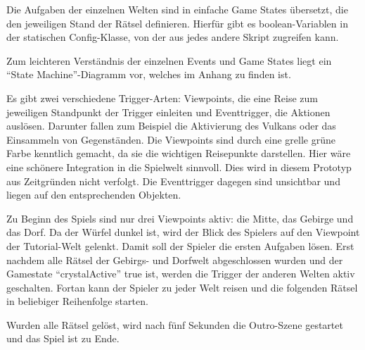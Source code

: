 
Die Aufgaben der einzelnen Welten sind in einfache Game States übersetzt, die den jeweiligen Stand der Rätsel definieren. Hierfür gibt es boolean-Variablen in der statischen Config-Klasse, von der aus jedes andere Skript zugreifen kann.

Zum leichteren Verständnis der einzelnen Events und Game States liegt ein \enquote{State Machine}-Diagramm vor, welches im Anhang zu finden ist.

Es gibt zwei verschiedene Trigger-Arten: Viewpoints, die eine Reise zum jeweiligen Standpunkt der Trigger einleiten und Eventtrigger, die Aktionen auslösen. Darunter fallen zum Beispiel die Aktivierung des Vulkans oder das Einsammeln von Gegenständen.
Die Viewpoints sind durch eine grelle grüne Farbe kenntlich gemacht, da sie die wichtigen Reisepunkte darstellen. Hier wäre eine schönere Integration in die Spielwelt sinnvoll. Dies wird in diesem Prototyp aus Zeitgründen nicht verfolgt. Die Eventtrigger dagegen sind unsichtbar und liegen auf den entsprechenden Objekten.

Zu Beginn des Spiels sind nur drei Viewpoints aktiv: die Mitte, das Gebirge und das Dorf. Da der Würfel dunkel ist, wird der Blick des Spielers auf den Viewpoint der Tutorial-Welt gelenkt. Damit soll der Spieler die ersten Aufgaben lösen. Erst nachdem alle Rätsel der Gebirgs- und Dorfwelt abgeschlossen wurden und der Gamestate \enquote{crystalActive} true ist, werden die Trigger der anderen Welten aktiv geschalten. Fortan kann der Spieler zu jeder Welt reisen und die folgenden Rätsel in beliebiger Reihenfolge starten.

Wurden alle Rätsel gelöst, wird nach fünf Sekunden die Outro-Szene gestartet und das Spiel ist zu Ende.